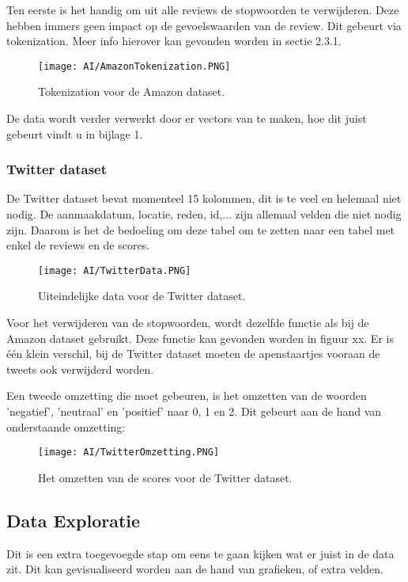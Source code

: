 Ten eerste is het handig om uit alle reviews de stopwoorden te verwijderen. Deze hebben immers geen impact op de gevoelswaarden van de review. Dit gebeurt via tokenization. Meer info hierover kan gevonden worden in sectie 2.3.1.

\begin{figure}[!htbp]
    \texttt{[image: AI/AmazonTokenization.PNG]}
    \caption{\label{amazontokenization}Tokenization voor de Amazon dataset.}
\end{figure}
\FloatBarrier

De data wordt verder verwerkt door er vectors van te maken, hoe dit juist gebeurt vindt u in bijlage 1.

\subsubsection{Twitter dataset} 
De Twitter dataset bevat momenteel 15 kolommen, dit is te veel en helemaal niet nodig. De aanmaakdatum, locatie, reden, id,... zijn allemaal velden die niet nodig zijn. Daarom is het de bedoeling om deze tabel om te zetten naar een tabel met enkel de reviews en de scores. 


\begin{figure}[!htbp]
    \texttt{[image: AI/TwitterData.PNG]}
    \caption{\label{twitterdata}Uiteindelijke data voor de Twitter dataset.}
\end{figure}
\FloatBarrier

Voor het verwijderen van de stopwoorden, wordt dezelfde functie als bij de Amazon dataset gebruikt. Deze functie kan gevonden worden in figuur xx. Er is één klein verschil, bij de Twitter dataset moeten de apenstaartjes vooraan de tweets ook verwijderd worden. 

Een tweede omzetting die moet gebeuren, is het omzetten van de woorden 'negatief', 'neutraal' en 'positief' naar 0, 1 en 2. Dit gebeurt aan de hand van onderstaande omzetting:

\begin{figure}[!htbp]
    \texttt{[image: AI/TwitterOmzetting.PNG]}
    \caption{\label{twitteromzetting}Het omzetten van de scores voor de Twitter dataset.}
\end{figure}
\FloatBarrier


\subsection{Data Exploratie}
\label{proofofconceptdataexploratie}
Dit is een extra toegevoegde stap om eens te gaan kijken wat er juist in de data zit. Dit kan gevisualiseerd worden aan de hand van grafieken, of extra velden. 

